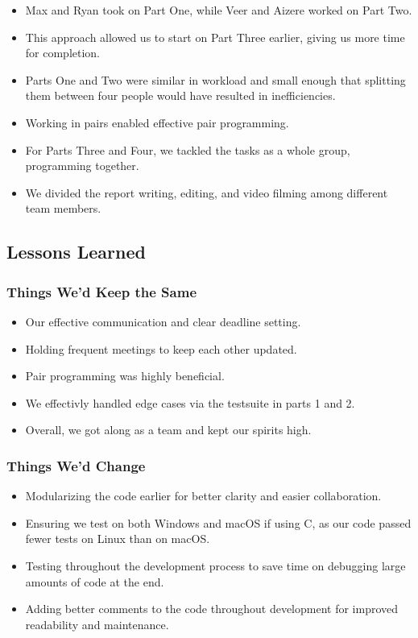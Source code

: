 \documentclass{article}
\begin{document}
\begin{itemize}
    \item Max and Ryan took on Part One, while Veer and Aizere worked on Part Two. 
    \item This approach allowed us to start on Part Three earlier, giving us more time for completion.
    \item Parts One and Two were similar in workload and small enough that splitting them between four people would have resulted in inefficiencies.
    \item Working in pairs enabled effective pair programming.
    \item For Parts Three and Four, we tackled the tasks as a whole group, programming together.
    \item We divided the report writing, editing, and video filming among different team members.
\end{itemize}

\subsection{Lessons Learned}
\subsubsection{Things We'd Keep the Same}
\begin{itemize}
    \item Our effective communication and clear deadline setting.
    \item Holding frequent meetings to keep each other updated.
    \item Pair programming was highly beneficial.
    \item We effectivly handled edge cases via the testsuite in parts 1 and 2.
    \item Overall, we got along as a team and kept our spirits high.
\end{itemize}

\subsubsection{Things We'd Change}
\begin{itemize}
    \item Modularizing the code earlier for better clarity and easier collaboration.
    \item Ensuring we test on both Windows and macOS if using C, as our code passed fewer tests on Linux than on macOS.
    \item Testing throughout the development process to save time on debugging large amounts of code at the end.
    \item Adding better comments to the code throughout development for improved readability and maintenance.
\end{itemize}
\end{document}
